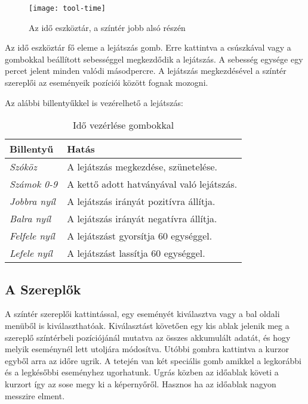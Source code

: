 \begin{figure}[h!]
	\centering
	\texttt{[image: tool-time]}
	\caption{Az idő eszköztár, a színtér jobb alsó részén}
	\label{fig:tool-time}
\end{figure}

Az idő eszköztár fő eleme a lejátszás gomb. Erre kattintva a csúszkával vagy a gombokkal beállított sebességgel megkezdődik a lejátszás. A sebesség egysége egy percet jelent minden valódi másodpercre. A lejátszás megkezdésével a színtér szereplői az eseményeik pozíciói között fognak mozogni.

Az alábbi billentyűkkel is vezérelhető a lejátszás:

\begin{table}[H]
	\centering
	\begin{tabular}{ | m{} | m{} | }
		\hline
		\textbf{Billentyű} & \textbf{Hatás}\\
		\hline \hline
		\emph{Szóköz} & A lejátszás megkezdése, szünetelése. \\
		\hline
		\emph{Számok 0-9} & A kettő adott hatványával való lejátszás. \\
		\hline
		\emph{Jobbra nyíl} & A lejátszás irányát pozitívra állítja.  \\
		\hline
		\emph{Balra nyíl} & A lejátszás irányát negatívra állítja.  \\
		\hline
		\emph{Felfele nyíl} & A lejátszást gyorsítja 60 egységgel. \\
		\hline
		\emph{Lefele nyíl} & A lejátszást lassítja 60 egységgel.  \\
		\hline
	\end{tabular}
	\caption{Idő vezérlése gombokkal}
	\label{tab:tool-time-control-keys}
\end{table}

\subsection{A Szereplők} \label{section:ui-actors}

A színtér szereplői kattintással, egy eseményét kiválasztva vagy a bal oldali menüből is kiválaszthatóak. Kiválasztást követően egy kis ablak jelenik meg a szereplő színtérbeli pozíciójánál mutatva az összes akkumulált adatát, és hogy melyik eseménynél lett utoljára módosítva. Utóbbi gombra kattintva a kurzor egyből arra az időre ugrik. A tetején van két speciális gomb amikkel a legkorábbi és a legkésőbbi eseményhez ugorhatunk. Ugrás közben az időablak követi a kurzort így az sose megy ki a képernyőről. Hasznos ha az időablak nagyon messzire elment.

